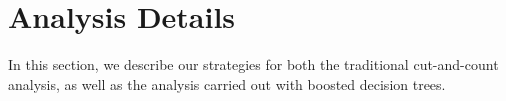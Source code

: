 \documentclass[a4paper,11pt]{article}
\begin{document}

\section{Analysis Details}\label{sec:analysis}

In this section, we  describe our strategies for both the traditional
cut-and-count analysis, as well as the analysis carried out with boosted
decision trees. 
\end{document}
